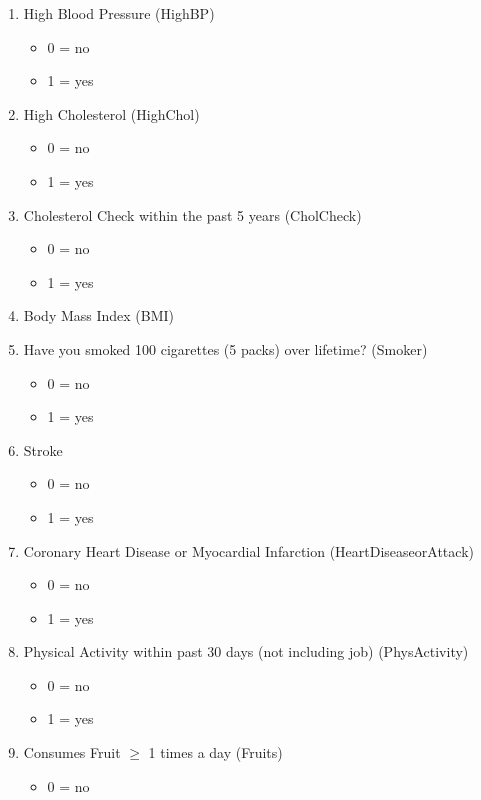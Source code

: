\documentclass[journal]{IEEEtran}
\begin{document}
\begin{enumerate}
\item High Blood Pressure (HighBP)
	\begin{itemize}
        \item 0 = no
        \item 1 = yes
	\end{itemize}
\item High Cholesterol (HighChol)
	\begin{itemize}
        \item 0 = no
        \item 1 = yes
	\end{itemize}
\item Cholesterol Check within the past 5 years (CholCheck)
    \begin{itemize}
    \item 0 = no
    \item 1 = yes
    \end{itemize}
\item Body Mass Index (BMI)
\item Have you smoked 100 cigarettes (5 packs) over lifetime? (Smoker)
    \begin{itemize}
    \item 0 = no
    \item 1 = yes
    \end{itemize}
\item Stroke
    \begin{itemize}
    \item 0 = no
    \item 1 = yes
    \end{itemize}
\item Coronary Heart Disease or Myocardial Infarction (HeartDiseaseorAttack)
    \begin{itemize}
    \item 0 = no
    \item 1 = yes
    \end{itemize}
\item Physical Activity within past 30 days (not including job) (PhysActivity)
\begin{itemize}
    \item 0 = no
    \item 1 = yes
    \end{itemize}
\item Consumes Fruit $\geq$ 1 times a day (Fruits)
\begin{itemize}
    \item 0 = no

\end{itemize}
\end{enumerate}
\end{document}
